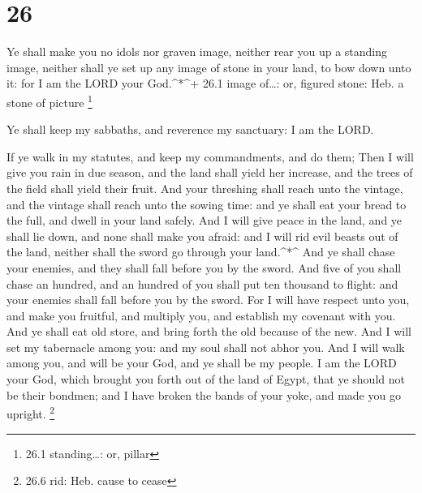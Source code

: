 \hypertarget{section-25}{%
\section{26}\label{section-25}}

 Ye shall make you no idols nor graven image, neither rear
you up a standing image, neither shall ye set up any image of stone in
your land, to bow down unto it: for I am the LORD your God.\^{}*\^{}+
26.1 image of\ldots: or, figured stone: Heb. a stone of picture
\footnote{26.1 standing\ldots: or, pillar}

 Ye shall keep my sabbaths, and reverence my sanctuary: I am
the LORD.

 If ye walk in my statutes, and keep my commandments, and do
them;  Then I will give you rain in due season, and the land
shall yield her increase, and the trees of the field shall yield their
fruit.  And your threshing shall reach unto the vintage, and
the vintage shall reach unto the sowing time: and ye shall eat your
bread to the full, and dwell in your land safely.  And I
will give peace in the land, and ye shall lie down, and none shall make
you afraid: and I will rid evil beasts out of the land, neither shall
the sword go through your land.\^{}*\^{}  And ye shall chase
your enemies, and they shall fall before you by the sword. 
And five of you shall chase an hundred, and an hundred of you shall put
ten thousand to flight: and your enemies shall fall before you by the
sword.  For I will have respect unto you, and make you
fruitful, and multiply you, and establish my covenant with you.
 And ye shall eat old store, and bring forth the old
because of the new.  And I will set my tabernacle among
you: and my soul shall not abhor you.  And I will walk
among you, and will be your God, and ye shall be my people.
 I am the LORD your God, which brought you forth out of the
land of Egypt, that ye should not be their bondmen; and I have broken
the bands of your yoke, and made you go upright. \footnote{26.6 rid:
  Heb. cause to cease}

